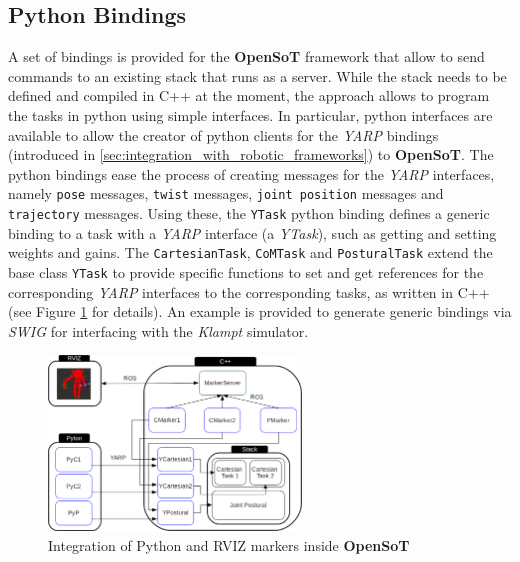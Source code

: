 \subsection{Python Bindings}
A set of bindings is provided for the \textbf{OpenSoT} framework that allow to send commands to an existing stack that runs as a server. While the stack needs to be defined and compiled in C++ at the moment, the approach allows to program the tasks in python using simple interfaces. In particular, python interfaces are available to allow the creator of python clients for the \emph{YARP} bindings (introduced in \ref{sec:integration_with_robotic_frameworks}) to \textbf{OpenSoT}. The python bindings ease the process of creating messages for the \emph{YARP} interfaces, namely \texttt{pose} messages, \texttt{twist} messages, \texttt{joint position} messages and \texttt{trajectory} messages. Using these, the \texttt{YTask} python binding defines a generic binding to a task with a \emph{YARP} interface (a \emph{YTask}), such as getting and setting weights and gains. The \texttt{CartesianTask}, \texttt{CoMTask} and \texttt{PosturalTask} extend the base class \texttt{YTask} to provide specific functions to set and get references for the corresponding \emph{YARP} interfaces to the corresponding tasks, as written in C++ (see Figure \ref{fig:python_binding} for details).
An example is provided to generate generic bindings via \emph{SWIG} for interfacing with the \emph{Klampt} simulator.
\begin{figure}
\vspace{2 mm}
\centering \includegraphics[width=0.6\textwidth]{images/software/python_markers.eps} 
\caption{Integration of Python and RVIZ markers inside \textbf{OpenSoT}} 
\label{fig:python_binding}
\end{figure}


